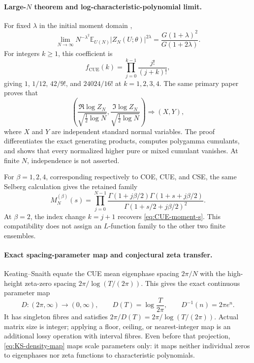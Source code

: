 \paragraph{Large-$N$ theorem and log-characteristic-polynomial limit.}
For fixed $\lambda$ in the initial moment domain
\cite[eqs.~(15)--(16) and~(80)--(88)]{keatingSnaith2000},
\begin{equation}
 \lim_{N\to\infty}N^{-\lambda^2}
 \mathbb E_{U(N)}|Z_N(U;\theta)|^{2\lambda}
 =\frac{G(1+\lambda)^2}{G(1+2\lambda)}.
 \label{eq:CUE-Barnes}
\end{equation}
For integers $k\geq1$, this coefficient is
\begin{equation}
 f_{\mathrm{CUE}}(k)=\prod_{j=0}^{k-1}\frac{j!}{(j+k)!},
 \label{eq:CUE-integer-coefficient}
\end{equation}
giving $1$, $1/12$, $42/9!$, and $24024/16!$ at $k=1,2,3,4$.
The same primary paper proves that
\cite[eqs.~(9)--(14) and~(34)--(79)]{keatingSnaith2000}
\begin{equation}
 \left(
 \frac{\Re\log Z_N}{\sqrt{\tfrac12\log N}},
 \frac{\Im\log Z_N}{\sqrt{\tfrac12\log N}}
 \right)
 \Longrightarrow (X,Y),
 \label{eq:CUE-joint-CLT}
\end{equation}
where $X$ and $Y$ are independent standard normal variables.  The proof differentiates the
exact generating products, computes polygamma cumulants, and shows that every normalized
higher pure or mixed cumulant vanishes.  At finite $N$, independence is not asserted.

For $\beta=1,2,4$, corresponding respectively to COE, CUE, and CSE, the same Selberg
calculation gives the retained family
\cite[eqs.~(109)--(111)]{keatingSnaith2000}
\begin{equation}
 M_N^{(\beta)}(s)=
 \prod_{j=0}^{N-1}
 \frac{\Gamma(1+j\beta/2)\Gamma(1+s+j\beta/2)}
      {\Gamma(1+s/2+j\beta/2)^2}.
 \label{eq:circular-beta-moment}
\end{equation}
At $\beta=2$, the index change $k=j+1$ recovers \eqref{eq:CUE-moment-s}.  This
compatibility does not assign an $L$-function family to the other two finite ensembles.

\paragraph{Exact spacing-parameter map and conjectural zeta transfer.}
Keating--Snaith equate the CUE mean eigenphase spacing $2\pi/N$ with the high-height
zeta-zero spacing $2\pi/\log(T/(2\pi))$.  This gives the exact continuous parameter map
\cite[eqs.~(8) and~(92)]{keatingSnaith2000}
\begin{equation}
 D:(2\pi,\infty)\longrightarrow(0,\infty),
 \qquad D(T)=\log\frac{T}{2\pi},
 \qquad D^{-1}(n)=2\pi e^n.
 \label{eq:KS-density-map}
\end{equation}
It has singleton fibres and satisfies
$2\pi/D(T)=2\pi/\log(T/(2\pi))$.  Actual matrix size is integer; applying a floor,
ceiling, or nearest-integer map is an additional lossy operation with interval fibres.  Even
before that projection, \eqref{eq:KS-density-map} maps scale parameters only: it maps neither
individual zeros to eigenphases nor zeta functions to characteristic polynomials.

